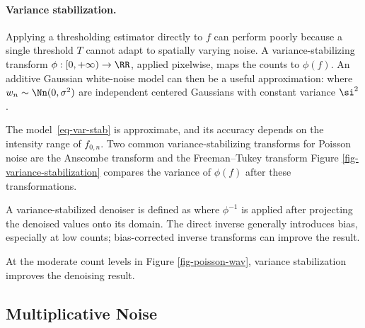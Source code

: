   
\paragraph{Variance stabilization.}

Applying a thresholding estimator
directly to $f$ can perform poorly because a single threshold $T$ cannot adapt to spatially varying noise. A variance-stabilizing transform $\phi : [0,+\infty) \rightarrow \RR$, applied pixelwise, maps the counts to $\phi(f)$. An additive Gaussian white-noise model can then be a useful approximation:
where $w_n\sim\Nn(0,\sigma^2)$ are independent centered Gaussians with constant variance $\si^2$.

The model~\eqref{eq-var-stab} is approximate, and its accuracy depends on the intensity range of $f_{0,n}$.
Two common variance-stabilizing transforms for Poisson noise are the Anscombe transform
and the Freeman--Tukey transform
Figure \ref{fig-variance-stabilization} compares the variance of $\phi(f)$ after these transformations.


A variance-stabilized denoiser is defined as
where $\phi^{-1}$ is applied after projecting the denoised values onto its domain. The direct inverse generally introduces bias, especially at low counts; bias-corrected inverse transforms can improve the result.

At the moderate count levels in Figure \ref{fig-poisson-wav}, variance stabilization improves the denoising result.


                                                     
\subsection{Multiplicative Noise}

